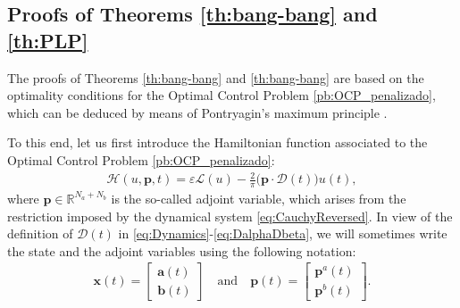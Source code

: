 \documentclass[twocolumn]{autart}    %
\begin{document}
\subsection{Proofs of Theorems \ref{th:bang-bang} and \ref{th:PLP}}

The proofs of Theorems \ref{th:bang-bang} and \ref{th:bang-bang} are based on the optimality conditions for the Optimal Control Problem \ref{pb:OCP_penalizado}, which can be deduced by means of Pontryagin's maximum principle \cite[Chapter~2.7]{bryson1975applied}.

To this end, let us first introduce the Hamiltonian function associated to the Optimal Control Problem \ref{pb:OCP_penalizado}:
\begin{align}\label{eq:hamil}
    \mathcal{H}(u,\bm{p},t) = \varepsilon \mathcal{L}(u) - \frac 2\pi\big(\bm{p} \cdot \bm{\mathcal{D}}(t)\big)u(t),
\end{align}
where $\bm{p}\in \mathbb{R}^{N_a+N_b}$ is the so-called adjoint variable, which arises from the restriction imposed by the dynamical system \eqref{eq:CauchyReversed}. In view of the definition of $\bm{\mathcal{D}}(t)$ in \eqref{eq:Dynamics}-\eqref{eq:DalphaDbeta}, we will sometimes write the state and the adjoint variables using the following notation:
\begin{align*}
  \bm{x}(t) = \begin{bmatrix} \bm{a}(t) \\ \bm{b}(t) \end{bmatrix} \quad \text{and}\quad
  \bm{p}(t) = \begin{bmatrix} \bm{p}^a(t) \\ \bm{p}^b(t) \end{bmatrix}.
\end{align*}
\end{document}
